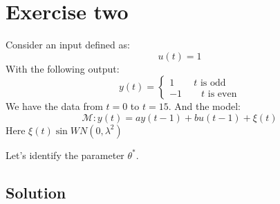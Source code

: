 \section{Exercise two}

Consider an input defined as:
\[u(t)=1\]
With the following output:
\[y(t)=\begin{cases}
    1 \qquad t \text{ is odd} \\
    -1 \qquad t \text{ is even} 
\end{cases}\]
We have the data from $t=0$ to $t=15$. 
And the model: 
\[\mathcal{M}:y(t)=ay(t-1)+bu(t-1)+\xi(t)\]
Here $\xi(t)\sin WN(0,\lambda^2)$

Let's identify the parameter $\theta^\ast$. 

\subsection*{Solution}
